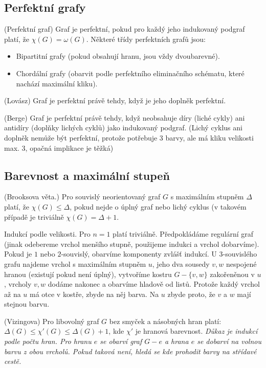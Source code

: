 
\subsection{Perfektní grafy}

\df (Perfektní graf) Graf je perfektní, pokud pro každý jeho indukovaný podgraf 
platí, že $\chi(G) = \omega(G)$. Některé třídy perfektních grafů jsou:
\begin{itemize}
	\item Bipartitní grafy (pokud obsahují hranu, jsou vždy dvoubarevné).
	\item Chordální grafy (obarvit podle perfektního eliminačního schématu, 
		které nachází maximální kliku).
\end{itemize}

\vt (Lovász) Graf je perfektní právě tehdy, když je jeho doplněk perfektní.

\vt (Berge) Graf je perfektní právě tehdy, když neobsahuje díry (liché cykly) 
ani antidíry (doplňky lichých cyklů) jako indukovaný podgraf.  (Lichý cyklus ani 
doplněk nemůže být perfektní, protože potřebuje 3 barvy, ale má kliku velikosti 
max. 3, opačná implikace je těžká)

\subsection{Barevnost a maximální stupeň}

\vt (Brooksova věta.) Pro souvislý neorientovaný graf $G$ s maximálním stupněm 
$\Delta$ platí, že $\chi(G) \leq \Delta$, pokud nejde o úplný graf nebo lichý 
cyklus (v takovém případě je triviálně $\chi(G) = \Delta+1$.

\dk Indukcí podle velikosti. Pro $n = 1$ platí triviálně.  Předpokládáme 
regulární graf (jinak odebereme vrchol menšího stupně, použijeme indukci a 
vrchol dobarvíme). Pokud je $1$ nebo $2$-souvislý, obarvíme komponenty zvlášť 
indukcí. U 3-souvislého grafu najdeme vrchol s maximálním stupněm $u$, jeho dva 
sousedy $v,w$ nespojené hranou (existují pokud není úplný), vytvoříme kostru 
$G-\{v,w\}$ zakořeněnou v $u$, vrcholy $v,w$ dodáme nakonec a obarvíme hladově 
od listů.  Protože každý vrchol až na $u$ má otce v kostře, zbyde na něj
barva. Na $u$ zbyde proto, že $v$ a $w$ mají stejnou barvu.

\vt (Vizingova) Pro libovolný graf $G$ bez smyček a násobných hran platí: 
$\Delta(G) \leq \chi'(G) \leq \Delta(G) +1$, kde $\chi'$ je hranová barevnost.
{\it Důkaz je indukcí podle počtu hran. Pro hranu $e$ se obarví graf $G-e$ a 
	hrana $e$ se dobarví na volnou barvu z obou vrcholů. Pokud taková není, 
hledá se kde prohodit barvy na střídavé cestě.}

